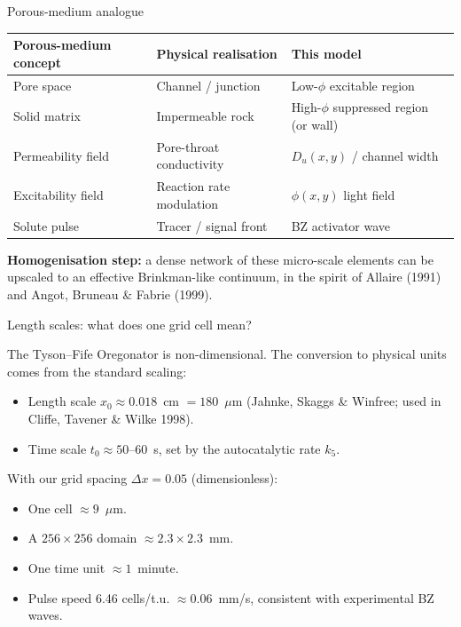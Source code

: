 \documentclass[aspectratio=169,11pt]{beamer}
\begin{document}
\begin{frame}{Porous-medium analogue}

\begin{table}
\centering
\footnotesize
\begin{tabular}{p{4.5cm}p{4.5cm}p{4.5cm}}
\toprule
\textbf{Porous-medium concept} & \textbf{Physical realisation} & \textbf{This model} \\
\midrule
Pore space & Channel / junction & Low-$\phi$ excitable region \\
Solid matrix & Impermeable rock & High-$\phi$ suppressed region (or wall) \\
Permeability field & Pore-throat conductivity & $D_u(x,y)$ / channel width \\
Excitability field & Reaction rate modulation & $\phi(x,y)$ light field \\
Solute pulse & Tracer / signal front & BZ activator wave \\
\bottomrule
\end{tabular}
\end{table}

\vspace{0.3cm}
\textbf{Homogenisation step:} a dense network of these micro-scale elements can be upscaled to an effective Brinkman-like continuum, in the spirit of Allaire (1991) and Angot, Bruneau \& Fabrie (1999).

\end{frame}

\begin{frame}{Length scales: what does one grid cell mean?}

The Tyson--Fife Oregonator is non-dimensional. The conversion to physical units comes from the standard scaling:

\vspace{0.3cm}
\begin{itemize}
    \item Length scale $x_0 \approx 0.018$~cm $= 180$~$\mu$m (Jahnke, Skaggs \& Winfree; used in Cliffe, Tavener \& Wilke 1998).
    \item Time scale $t_0 \approx 50$--$60$~s, set by the autocatalytic rate $k_5$.
\end{itemize}

\vspace{0.3cm}
With our grid spacing $\Delta x = 0.05$ (dimensionless):
\begin{itemize}
    \item One cell $\approx 9$~$\mu$m.
    \item A $256 \times 256$ domain $\approx 2.3 \times 2.3$~mm.
    \item One time unit $\approx 1$~minute.
    \item Pulse speed 6.46 cells/t.u. $\approx 0.06$~mm/s, consistent with experimental BZ waves.
\end{itemize}

\end{frame}
\end{document}
